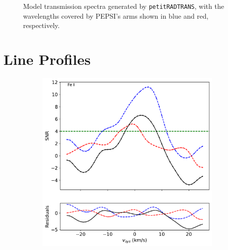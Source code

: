 \documentclass[twocolumn]{aastex631}
\newcommand{\code}[1]{\texttt{#1}}
\begin{document}
\begin{figure}[ht!]
\begin{subfigure}[b]{0.3\textwidth}
                \label{fig:Ca-spectrum}
            \end{subfigure}
            \caption{Model transmission spectra generated by \code{petitRADTRANS}, with the wavelengths covered by PEPSI's arms shown in blue and red, respectively.}
            \label{fig:main-spectra}
        \end{figure}
    
    \section{Line Profiles}
        \begin{figure}[ht!]
            \begin{subfigure}[b]{0.3\textwidth}
                \centering
                \includegraphics[width=\textwidth]{plots-updated/line-profile-overlaidarms/KELT-20b.20190504.combined.Fe I.line-profiles-overlaidarms.pdf}
            \end{subfigure}
            \begin{subfigure}[b]{0.3\textwidth}
                \centering

\end{subfigure}
\end{figure}
\end{document}
